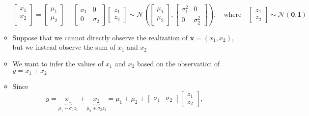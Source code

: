 \documentclass[12pt,a4paper]{article}
\begin{document}
\begin{itemize}
\begin{itemize}
\begin{equation}
      \begin{bmatrix}
        x_{1} \\
        x_{2} \\
      \end{bmatrix}
      =
        \begin{bmatrix}
          \mu_{1} \\
          \mu_{2}
        \end{bmatrix}
        +
        \begin{bmatrix}
          \sigma_{1} & 0 \\
          0 & \sigma_{2}
        \end{bmatrix}
      \begin{bmatrix}
       z_{1} \\ z_{2}
      \end{bmatrix}
      \sim \mathcal{N}
      \left(
        \begin{bmatrix}
          \mu_{1} \\
          \mu_{2}
        \end{bmatrix},
        \begin{bmatrix}
          \sigma_{1}^{2} & 0 \\
          0 & \sigma_{2}^{2}
        \end{bmatrix}
      \right),
      \quad\text{where}\quad
      \begin{bmatrix}
       z_{1} \\ z_{2}
      \end{bmatrix}
      \sim \mathcal{N}\left(\bm{0}, \bm{I} \right)
    \end{equation}
  \item Suppose that we cannot directly observe the realization of $\bm{x}=(x_{1},x_{2})$,
    but we instead observe the sum of $x_{1}$ and $x_{2}$
  \item We want to infer the values of $x_{1}$ and $x_{2}$ based on the observation of $y=x_{1}+x_{2}$
  \item Since
    \begin{equation}\nonumber%
      y = \underbrace{x_{1}}_{\mu_{1}+\sigma_{1}z_{1}} + \underbrace{x_{2}}_{\mu_{2}+\sigma_{2}z_{2}}
      = \mu_{1} + \mu_{2} +
      \begin{bmatrix}
       \sigma_{1} & \sigma_{2} 
      \end{bmatrix}
      \begin{bmatrix}
       z_{1} \\ z_{2}
      \end{bmatrix},

\end{equation}
\end{itemize}
\end{itemize}
\end{document}
